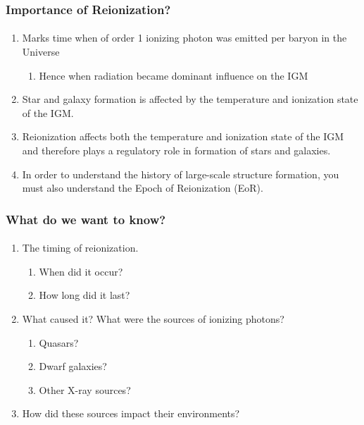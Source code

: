 \documentclass{beamer}
\begin{document}
\begin{frame}
\frametitle{Importance of Reionization?}
\framesubtitle{}
\begin{enumerate}[-]
\item Marks time when of order 1 ionizing photon was emitted per baryon in the Universe
\begin{enumerate}[$\to$]
\item Hence when radiation became dominant influence on the IGM
\end{enumerate}
\item Star and galaxy formation is affected by the temperature and ionization state of the IGM. 
\item Reionization affects both the temperature and ionization state of the IGM and therefore plays a regulatory role in formation of stars and galaxies.
\item In order to understand the history of large-scale structure formation, you must also understand the Epoch of Reionization (EoR).
\end{enumerate}
\end{frame}

\begin{frame}
\frametitle{What do we want to know?}
\framesubtitle{}
\begin{enumerate}[-]
\item The timing of reionization.
\begin{enumerate}[$\to$]
\item When did it occur?
\item How long did it last?
\end{enumerate}
\item What caused it? What were the sources of ionizing photons?
\begin{enumerate}[$\to$]
\item Quasars?
\item Dwarf galaxies?
\item Other X-ray sources?
\end{enumerate}
\item How did these sources impact their environments?
\end{enumerate}
\end{frame}
\end{document}
